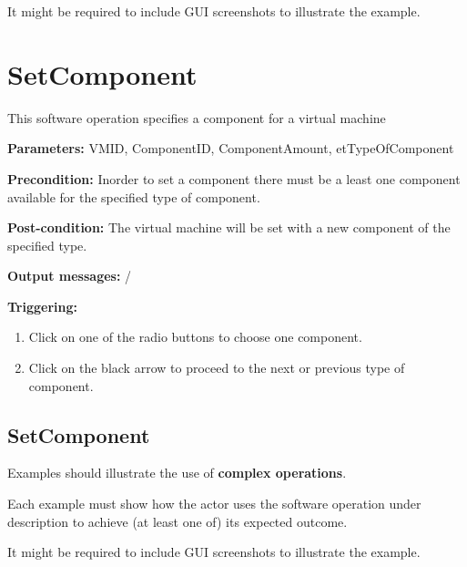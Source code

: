 It might be required to include GUI screenshots to illustrate the example.

























\section{SetComponent}
\label{operation:SetComponent}
This software operation specifies a component for a virtual machine
\begin{description}

\item \textbf{Parameters:} VMID, ComponentID, ComponentAmount,
etTypeOfComponent
\item \textbf{Precondition:} Inorder to set a component there must be a least
one component available for the specified type of component.
\item \textbf{Post-condition:} The virtual machine will be set with a new
component of the specified type.
\item \textbf{Output messages:} /

\item \textbf{Triggering:}
\begin{enumerate}
\item Click on one of the radio buttons to choose one component.
\item Click on the black arrow to proceed to the next or previous type of
component.
\end{enumerate}

 
\end{description}

 
\subsection{SetComponent}
Examples should illustrate the use of \textbf{complex operations}.

Each example must show how the actor uses the software operation under
description to achieve (at least one of) its expected outcome.

It might be required to include GUI screenshots to illustrate the example.












